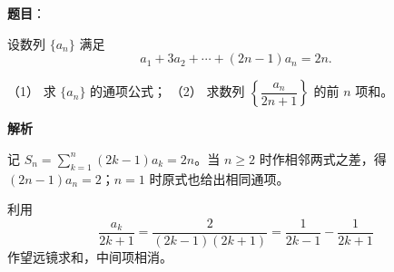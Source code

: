 \begin{answer}

\textbf{题目}：

设数列 \(\{a_n\}\) 满足
\nopagebreak[4]
\[
a_1+3a_2+\cdots +(2n-1)a_n=2n.
\]

（1） 求 \(\{a_n\}\) 的通项公式；
（2） 求数列 \(\left\{\dfrac{a_n}{2n+1}\right\}\) 的前 \(n\) 项和。

\textbf{解析}


记 \(S_n=\sum_{k=1}^n(2k-1)a_k=2n\)。当 \(n\ge2\) 时作相邻两式之差，得 \((2n-1)a_n=2\)；\(n=1\) 时原式也给出相同通项。


利用
\nopagebreak[4]
\[
\frac{a_k}{2k+1}=\frac{2}{(2k-1)(2k+1)}=\frac1{2k-1}-\frac1{2k+1}
\]
作望远镜求和，中间项相消。



\end{answer}
